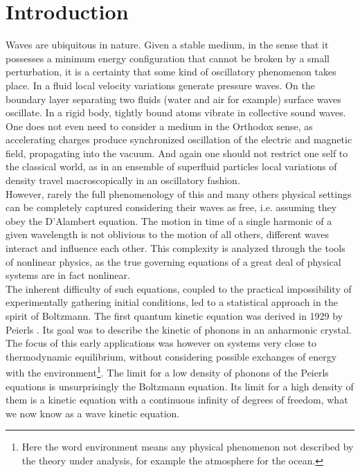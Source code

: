 

\newpage
\vphantom{}
\section*{Introduction}
    Waves are ubiquitous in nature. Given a stable medium, in the sense that it possesses a minimum energy configuration that cannot be broken by a small perturbation, it is a certainty that some kind of oscillatory phenomenon takes place. In a fluid local velocity variations generate pressure waves. On the boundary layer separating two fluids (water and air for example) surface waves oscillate. In a rigid body, tightly bound atoms vibrate in collective sound waves. One does not even need to consider a medium in the Orthodox sense, as accelerating charges produce synchronized oscillation of the electric and magnetic field, propagating into the vacuum. And again one should not restrict one self to the classical world, as in an ensemble of superfluid particles local variations of density travel macroscopically in an oscillatory fashion. \\
    However, rarely the full phenomenology of this and many others physical settings can be completely captured considering their waves as free, i.e. assuming they obey the D'Alambert equation. The motion in time of a single harmonic of a given wavelength is not oblivious to the motion of all others, different waves interact and influence each other. This complexity is analyzed through the tools of nonlinear physics, as the true governing equations of a great deal of physical systems are in fact nonlinear.\\
    The inherent difficulty of such equations, coupled to the practical impossibility of experimentally gathering initial conditions, led to a statistical approach in the spirit of Boltzmann. The first quantum kinetic equation was derived in 1929 by Peierls \cite{Peierls1929}. Its goal was to describe the kinetic of phonons in an anharmonic crystal. The focus of this early applications was however on systems very close to thermodynamic equilibrium, without considering possible exchanges of energy with the environment\footnote{Here the word environment means any physical phenomenon not described by the theory under analysis, for example the atmosphere for the ocean.}. The limit for a low density of phonons of the Peierls equations is unsurprisingly the Boltzmann equation. Its limit for a high density of them is a kinetic equation with a continuous infinity of degrees of freedom, what we now know as a wave kinetic equation. \\
